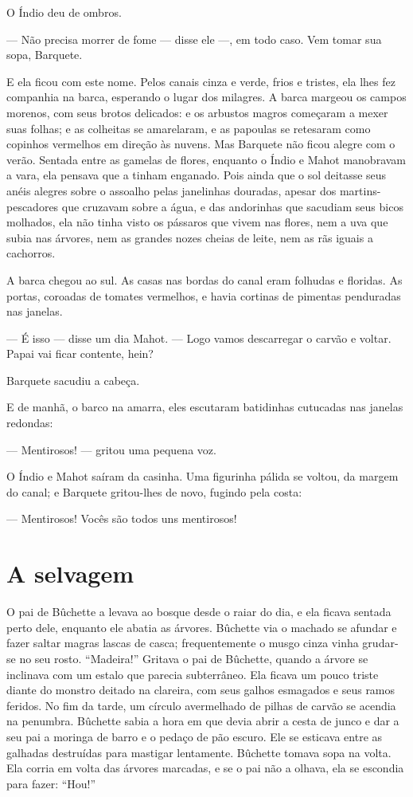 O Índio deu de ombros.

--- Não precisa morrer de fome --- disse ele ---, em todo caso.  Vem tomar sua
sopa, Barquete.

E ela ficou com este nome. Pelos canais cinza e verde, frios e tristes,
ela lhes fez companhia na barca, esperando o lugar dos milagres. A barca
margeou os campos morenos, com seus brotos delicados: e os arbustos magros
começaram a mexer suas folhas; e as colheitas se amarelaram, e as
papoulas se retesaram como copinhos vermelhos em direção às nuvens. Mas
Barquete não ficou alegre com o verão. Sentada entre as gamelas de flores,
enquanto o Índio e Mahot manobravam a vara, ela pensava que a tinham
enganado. Pois ainda que o sol deitasse seus anéis alegres sobre o
assoalho pelas janelinhas douradas, apesar dos martins-pescadores que
cruzavam sobre a água, e das andorinhas que sacudiam seus bicos molhados,
ela não tinha visto os pássaros que vivem nas flores, nem a uva que subia
nas árvores, nem as grandes nozes cheias de leite, nem as rãs iguais
a cachorros.

A barca chegou ao sul. As casas nas bordas do canal eram folhudas e
floridas. As portas, coroadas de tomates vermelhos, e havia cortinas de
pimentas penduradas nas janelas.

--- É isso --- disse um dia Mahot. --- Logo vamos descarregar o carvão e
voltar. Papai vai ficar contente, hein?

Barquete sacudiu a cabeça.

E de manhã, o barco na amarra, eles escutaram batidinhas cutucadas nas
janelas redondas:

--- Mentirosos! --- gritou uma pequena voz.

O Índio e Mahot saíram da casinha. Uma figurinha pálida se voltou,
da margem do canal; e Barquete gritou-lhes de novo, fugindo pela
costa:

--- Mentirosos! Vocês são todos uns mentirosos!

\section{A selvagem}

O pai de Bûchette a levava ao bosque desde o raiar do dia, e ela ficava
sentada perto dele, enquanto ele abatia as árvores. Bûchette via o machado
se afundar e fazer saltar magras lascas de casca; frequentemente o musgo
cinza vinha grudar-se no seu rosto. “Madeira!” Gritava o pai de Bûchette,
quando a árvore se inclinava com um estalo que parecia subterrâneo. Ela
ficava um pouco triste diante do monstro deitado na clareira, com seus
galhos esmagados e seus ramos feridos. No fim da tarde, um círculo avermelhado de
pilhas de carvão se acendia na penumbra. Bûchette sabia a hora em que
devia abrir a cesta de junco e dar a seu pai a moringa de barro e o pedaço
de pão escuro. Ele se esticava entre as galhadas destruídas para mastigar
lentamente. Bûchette tomava sopa na volta. Ela corria em volta das árvores
marcadas, e se o pai não a olhava, ela se escondia para fazer: “Hou!”

